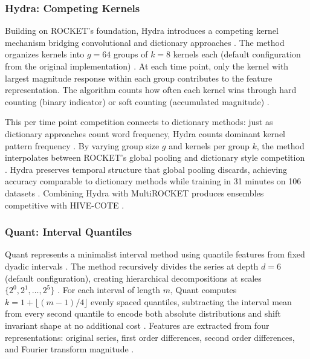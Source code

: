 \documentclass[pdflatex,sn-basic]{sn-jnl}           %
\theoremstyle{thmstyleone}%
\theoremstyle{thmstyletwo}%
\theoremstyle{thmstylethree}%
\begin{document}
\subsubsection{Hydra: Competing Kernels}

Building on ROCKET's foundation, Hydra introduces a competing kernel mechanism bridging convolutional and dictionary approaches \citep{hydra}. The method organizes kernels into $g=64$ groups of $k=8$ kernels each (default configuration from the original implementation) \citep[Section~3.2, p.~1788]{hydra}. At each time point, only the kernel with largest magnitude response within each group contributes to the feature representation. The algorithm counts how often each kernel wins through hard counting (binary indicator) or soft counting (accumulated magnitude) \citep[Section~3.2, pp.~1789--1790]{hydra}.

This per time point competition connects to dictionary methods: just as dictionary approaches count word frequency, Hydra counts dominant kernel pattern frequency \citep[p.~1786]{hydra}. By varying group size $g$ and kernels per group $k$, the method interpolates between ROCKET's global pooling and dictionary style competition \citep[Figure~2, p.~1791]{hydra}. Hydra preserves temporal structure that global pooling discards, achieving accuracy comparable to dictionary methods while training in 31 minutes on 106 datasets \citep[p.~1781]{hydra}. Combining Hydra with MultiROCKET produces ensembles competitive with HIVE-COTE \citep[pp.~1796--1797]{hydra}.

\subsubsection{Quant: Interval Quantiles}

Quant represents a minimalist interval method using quantile features from fixed dyadic intervals \citep{quant}. The method recursively divides the series at depth $d=6$ (default configuration), creating hierarchical decompositions at scales $\{2^0, 2^1, \ldots, 2^5\}$ \citep[p.~2384]{quant}. For each interval of length $m$, Quant computes $k = 1 + \lfloor (m-1)/4 \rfloor$ evenly spaced quantiles, subtracting the interval mean from every second quantile to encode both absolute distributions and shift invariant shape at no additional cost \citep[p.~2385, Figure~4, p.~2386]{quant}. Features are extracted from four representations: original series, first order differences, second order differences, and Fourier transform magnitude \citep[Section~3.1, p.~2384]{quant}.
\end{document}

